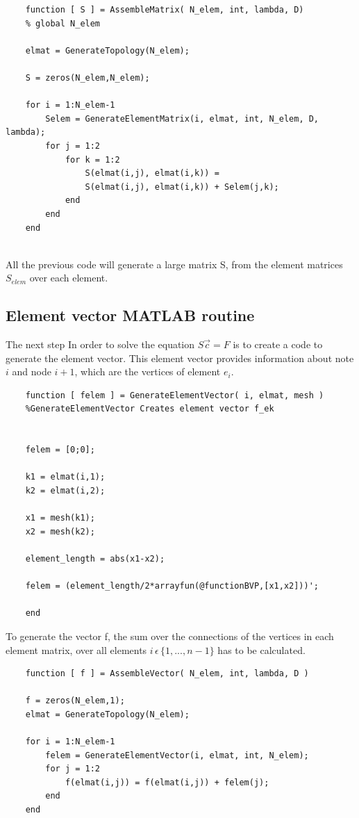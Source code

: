 \documentclass{report}
\begin{document}
\begin{lstlisting}
	function [ S ] = AssembleMatrix( N_elem, int, lambda, D)
	% global N_elem 
	
	elmat = GenerateTopology(N_elem);
	
	S = zeros(N_elem,N_elem);
	
	for i = 1:N_elem-1
		Selem = GenerateElementMatrix(i, elmat, int, N_elem, D, lambda);
		for j = 1:2
			for k = 1:2
				S(elmat(i,j), elmat(i,k)) =
				S(elmat(i,j), elmat(i,k)) +	Selem(j,k);
			end
		end
	end


\end{lstlisting}



All the previous code will generate a large matrix S, from the element matrices $S_{elem}$ over each element.\\



\subsection{Element vector MATLAB routine}

The next step In order to solve the equation $S\vec{c}=F$ is to create a code to generate the element vector. This element vector provides information about note $i$ and node $i+1$, which are the vertices of element $e_i$.\\



\begin{lstlisting}
	function [ felem ] = GenerateElementVector( i, elmat, mesh )
	%GenerateElementVector Creates element vector f_ek
	
	
	felem = [0;0];
	
	k1 = elmat(i,1);
	k2 = elmat(i,2);
	
	x1 = mesh(k1);
	x2 = mesh(k2);
	
	element_length = abs(x1-x2);
	
	felem = (element_length/2*arrayfun(@functionBVP,[x1,x2]))';
	
	end
\end{lstlisting}

\smallskip

To generate the vector f, the sum over the connections of the vertices in each element matrix, over all elements $i\,\epsilon\, \{1,...,n-1\}$  has to be calculated. 

\bigskip

	
\begin{lstlisting}
	function [ f ] = AssembleVector( N_elem, int, lambda, D )
		
	f = zeros(N_elem,1);
	elmat = GenerateTopology(N_elem);
		
	for i = 1:N_elem-1
		felem = GenerateElementVector(i, elmat, int, N_elem);
		for j = 1:2
			f(elmat(i,j)) = f(elmat(i,j)) + felem(j);
		end
	end
\end{lstlisting}	
\end{document}
